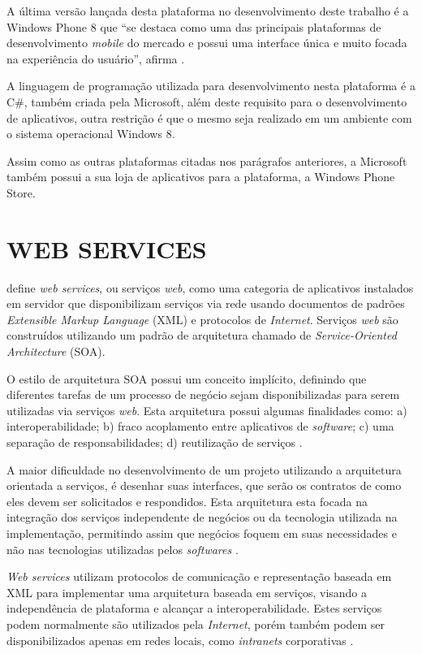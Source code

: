 \documentclass[
	12pt,				%
	openright,			%
	oneside,			%
	a4paper,			%
	chapter=TITLE,		%
	section=TITLE,		%
	english,			%
	french,				%
	spanish,			%
	brazil				%
	]{abntex2}
\begin{document}
A última versão lançada desta plataforma no desenvolvimento deste trabalho é a Windows Phone 8 que “se destaca como uma das principais plataformas de desenvolvimento \textit{mobile} do mercado e possui uma interface única e muito focada na experiência do usuário”, afirma . 

A linguagem de programação utilizada para desenvolvimento nesta plataforma é a C\#, também criada pela Microsoft, além deste requisito para o desenvolvimento de aplicativos, outra restrição é que o mesmo seja realizado em um ambiente com o sistema operacional Windows 8. 

Assim como as outras plataformas citadas nos parágrafos anteriores, a Microsoft também possui a sua loja de aplicativos para a plataforma, a Windows Phone Store.


\section{WEB SERVICES}

 define \textit{web services}, ou serviços \textit{web}, como uma categoria de aplicativos instalados em servidor que disponibilizam serviços via rede usando documentos de padrões \textit{Extensible Markup Language} (XML) e protocolos de \textit{Internet}.  Serviços \textit{web} são construídos utilizando um padrão de arquitetura chamado de \textit{Service-Oriented Architecture} (SOA).  

O estilo de arquitetura SOA possui um conceito implícito, definindo que diferentes tarefas de um processo de negócio sejam disponibilizadas para serem utilizadas via serviços \textit{web}. Esta arquitetura possui algumas finalidades como: a) interoperabilidade; b) fraco acoplamento entre aplicativos de \textit{software}; c) uma separação de responsabilidades; d) reutilização de serviços \cite{qian2010desenvolvimento}.

A maior dificuldade no desenvolvimento de um projeto utilizando a arquitetura orientada a serviços, é desenhar suas interfaces, que serão os contratos de como eles devem ser solicitados e respondidos. Esta arquitetura esta focada na integração dos serviços independente de negócios ou da tecnologia utilizada na implementação, permitindo assim que negócios foquem em suas necessidades e não nas tecnologias utilizadas pelos \textit{softwares} \cite{qian2010desenvolvimento}.

\textit{Web services} utilizam protocolos de comunicação e representação baseada em XML para implementar uma arquitetura baseada em serviços, visando a independência de plataforma e alcançar a interoperabilidade. Estes serviços podem normalmente são utilizados pela \textit{Internet}, porém também podem ser disponibilizados apenas em redes locais, como \textit{intranets} corporativas \cite{qian2010desenvolvimento}.
\end{document}
